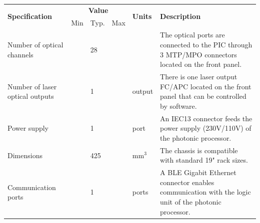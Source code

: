 \begin{table}[h!]
  \small
	\centering
	\begin{tabular}{|m{4cm}|m{1.0cm}|m{1.0cm}|m{1.0cm}|m{1.5cm}|m{5.5cm}|}
		\hline
		\multirow{2}{*}{\textbf{Specification}} & \multicolumn{3}{c|}{\textbf{Value}} & \multirow{2}{*}{\textbf{Units}} & \multirow{2}{*}{\textbf{Description}}                                                                                                                                                 \\
		\cline{2-4}  %
		                                        & Min                                 & Typ.                            & Max                                   &           &                                                                                                                                   \\
		\hline
		Number of optical channels              &                                     & 28                              &                                       &           & The optical ports are connected to the PIC through 3 MTP/MPO connectors located on the front panel.
		\\
		\hline
		Number of laser optical outputs         &                                     & 1                               &                                       & output    & There is one laser output FC/APC located on the front panel that can be controlled by software.
		\\
		\hline
		Power supply                            &                                     & 1                               &                                       & port      & An IEC13 connector feeds the power supply (230V/110V) of the photonic processor.
		\\
		\hline
		Dimensions                              &                                     & 425 \times 425 \times 173       &                                       & mm$^3$    & The chassis is compatible with
    standard 19" rack sizes.                                                                          \\
		\hline
		Communication ports                     &                                     & 1                               &                                       & ports     & A BLE Gigabit Ethernet connector enables communication with the logic unit of the photonic processor.
		\\

\end{tabular}
\end{table}
